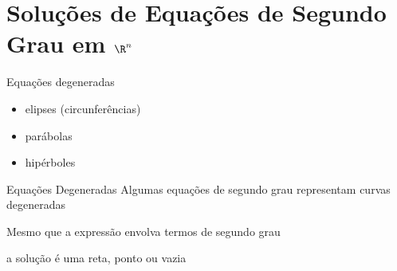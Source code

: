 \documentclass[fleqn,aspectratio=169,12pt]{beamer}
\begin{document}






\section{Soluções de Equações de Segundo Grau em $\R^n$}

\begin{frame}{Equações degeneradas}

  \begin{itemize}[<+->]
    \item elipses (circunferências)
    \item parábolas
    \item hipérboles
  \end{itemize}

\end{frame}

\begin{frame}{Equações Degeneradas}
  Algumas equações de segundo grau representam curvas degeneradas

  \pause
  \bigskip
  Mesmo que a expressão envolva termos de segundo grau

  a solução é uma reta, ponto ou vazia
\end{frame}





%
%

\end{document}
